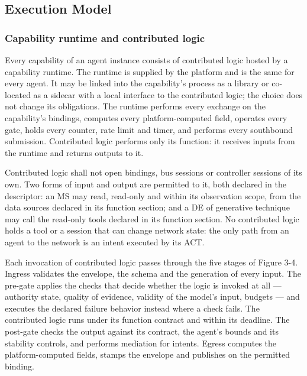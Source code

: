 \hypertarget{execution-model}{%
\subsection{Execution Model}\label{execution-model}}

\hypertarget{capability-runtime-and-contributed-logic}{%
\subsubsection{Capability runtime and contributed logic}\label{capability-runtime-and-contributed-logic}}

Every capability of an agent instance consists of contributed logic
hosted by a capability runtime. The runtime is supplied by the platform
and is the same for every agent. It may be linked into the capability's
process as a library or co-located as a sidecar with a local interface
to the contributed logic; the choice does not change its obligations.
The runtime performs every exchange on the capability's bindings,
computes every platform-computed field, operates every gate, holds every
counter, rate limit and timer, and performs every southbound submission.
Contributed logic performs only its function: it receives inputs from
the runtime and returns outputs to it.

Contributed logic shall not open bindings, bus sessions or controller
sessions of its own. Two forms of input and output are permitted to it,
both declared in the descriptor: an MS may read, read-only and within
its observation scope, from the data sources declared in its function
section; and a DE of generative technique may call the read-only tools
declared in its function section. No contributed logic holds a tool or a
session that can change network state: the only path from an agent to
the network is an intent executed by its ACT.

Each invocation of contributed logic passes through the five stages of
Figure 3-4. Ingress validates the envelope, the schema and the
generation of every input. The pre-gate applies the checks that decide
whether the logic is invoked at all --- authority state, quality of
evidence, validity of the model's input, budgets --- and executes the
declared failure behavior instead where a check fails. The contributed
logic runs under its function contract and within its deadline. The
post-gate checks the output against its contract, the agent's bounds and
its stability controls, and performs mediation for intents. Egress
computes the platform-computed fields, stamps the envelope and publishes
on the permitted binding.

